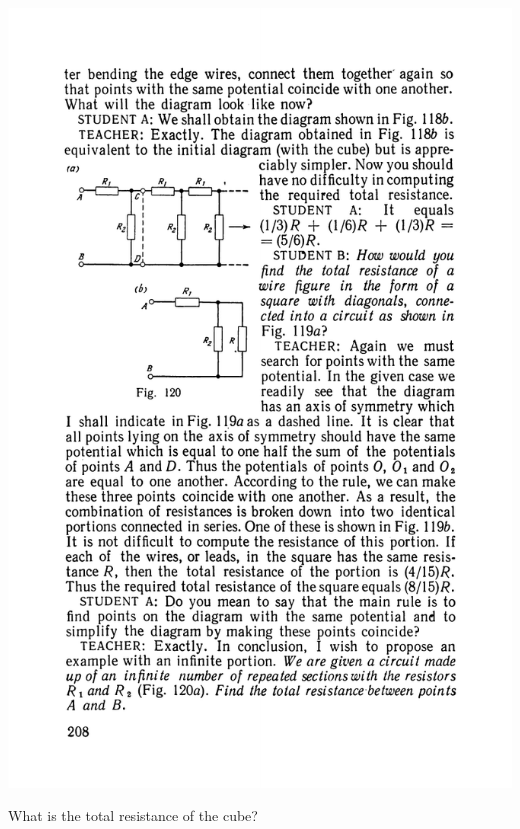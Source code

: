 \documentclass[a4paper,sfsidenotes]{tufte-book}
\begin{document}
\begin{marginfigure}%
\centering
\includegraphics[width=\linewidth]{fig-120a}
\caption{ What is the total resistance of the cube?}
\label{fig-120}
\end{marginfigure}
\end{document}
